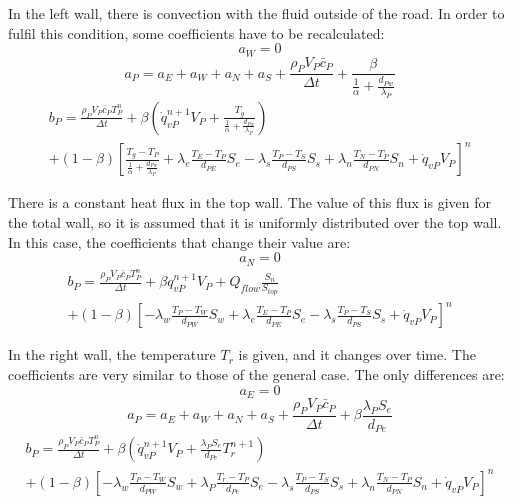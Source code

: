 In the left wall, there is convection with the fluid outside of the road. In order to fulfil this condition, some coefficients have to be recalculated:
\begin{equation}
a_{W}=0
\end{equation}
\begin{equation}
a_{P}=a_{E}+a_{W}+a_{N}+a_{S}+\frac{\rho_{P}V_{P}\bar{c}_{P}}{\Delta t}+\frac{\beta}{\frac{1}{\alpha}+\frac{d_{Pw}}{\lambda_{P}}}
\end{equation}
\begin{multline}
b_{P}=\frac{\rho_{P}V_{P}\bar{c}_{P}T_{P}^{n}}{\Delta t}+\beta\left(\dot{q}_{vP}^{n+1}V_{P}+\frac{T_{g}}{\frac{1}{\alpha}+\frac{d_{Pw}}{\lambda_{P}}}\right) \\
+\left(1-\beta\right)\left[\frac{T_{g}-T_{P}}{\frac{1}{\alpha}+\frac{d_{Pw}}{\lambda_{P}}}+\lambda_{e}\frac{T_{E}-T_{P}}{d_{PE}}S_{e}-\lambda_{s}\frac{T_{P}-T_{S}}{d_{PS}}S_{s}+\lambda_{n}\frac{T_{N}-T_{P}}{d_{PN}}S_{n}+\dot{q}_{vP}V_{P}\right]^{n}
\end{multline}

There is a constant heat flux in the top wall. The value of this flux is given for the total wall, so it is assumed that it is uniformly distributed over the top wall. In this case, the coefficients that change their value are:
\begin{equation}
a_{N}=0
\end{equation}
\begin{multline}
b_{P}=\frac{\rho_{P}V_{P}\bar{c}_{P}T_{P}^{n}}{\Delta t}+\beta\dot{q}_{vP}^{n+1}V_{P}+Q_{flow}\frac{S_{n}}{S_{top}} \\
+\left(1-\beta\right)\left[-\lambda_{w}\frac{T_{P}-T_{W}}{d_{PW}}S_{w}+\lambda_{e}\frac{T_{E}-T_{P}}{d_{PE}}S_{e}-\lambda_{s}\frac{T_{P}-T_{S}}{d_{PS}}S_{s}+\dot{q}_{vP}V_{P}\right]^{n}
\end{multline}

In the right wall, the temperature $T_{r}$ is given, and it changes over time. The coefficients are very similar to those of the general case. The only differences are:
\begin{equation}
a_{E}=0
\end{equation}
\begin{equation}
a_P=a_{E}+a_{W}+a_{N}+a_{S}+\frac{\rho_{P}V_{P}\bar{c}_{P}}{\Delta t}+\beta\frac{\lambda_{P}S_{e}}{d_{Pe}}
\end{equation}
\begin{multline}
b_{P}=\frac{\rho_{P}V_{P}\bar{c}_{P}T_{P}^{n}}{\Delta t}+\beta\left(\dot{q}_{vP}^{n+1}V_{P}+\frac{\lambda_{P}S_{e}}{d_{Pe}}T_{r}^{n+1}\right) \\
+\left(1-\beta\right)\left[-\lambda_{w}\frac{T_{P}-T_{W}}{d_{PW}}S_{w}+\lambda_{P}\frac{T_{r}-T_{P}}{d_{Pe}}S_{e}-\lambda_{s}\frac{T_{P}-T_{S}}{d_{PS}}S_{s}+\lambda_{n}\frac{T_{N}-T_{P}}{d_{PN}}S_{n}+\dot{q}_{vP}V_{P}\right]^{n}
\end{multline}


